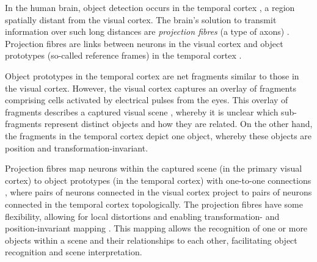 In the human brain, object detection occurs in the temporal cortex \cite{miyashita_inferior_1993, conway_organization_2018}, a region spatially distant from the visual cortex.
The brain's solution to transmit information over such long distances are \emph{projection fibres} (a type of axons) \cite{tanigawa_organization_2005, greig_molecular_2013}.
Projection fibres are links between neurons in the visual cortex and object prototypes (so-called reference frames) in the temporal cortex \cite{goodale_separate_1992}.

Object prototypes in the temporal cortex are net fragments similar to those in the visual cortex. However, the visual cortex captures an overlay of fragments comprising cells activated by electrical pulses from the eyes.
This overlay of fragments describes a captured visual scene \cite{von_der_malsburg_theory_2022}, whereby it is unclear which sub-fragments represent distinct objects and how they are related.
On the other hand, the fragments in the temporal cortex depict one object, whereby these objects are position and transformation-invariant.

Projection fibres map neurons within the captured scene (in the primary visual cortex) to object prototypes (in the temporal cortex) with one-to-one connections , where pairs of neurons connected in the visual cortex project to pairs of neurons connected in the temporal cortex topologically. The projection fibres have some flexibility, allowing for local distortions and enabling transformation- and position-invariant mapping . This mapping allows the recognition of one or more objects within a scene and their relationships to each other, facilitating object recognition and scene interpretation.

